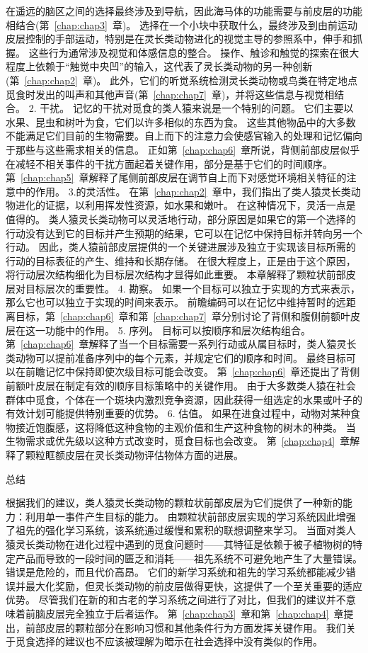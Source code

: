 在遥远的脑区之间的选择最终涉及到导航，因此海马体的功能需要与前皮层的功能相结合(第~\ref{chap:chap3}~章)。
选择在一个小块中获取什么，最终涉及到由前运动皮层控制的手部运动，特别是在灵长类动物进化的视觉主导的参照系中，伸手和抓握。
这些行为通常涉及视觉和体感信息的整合。
操作、触诊和触觉的探索在很大程度上依赖于“触觉中央凹”的输入，这代表了灵长类动物的另一种创新(第~\ref{chap:chap2}~章)。
此外，它们的听觉系统检测灵长类动物或鸟类在特定地点觅食时发出的叫声和其他声音(第~\ref{chap:chap7}~章)，并将这些信息与视觉相结合。
2. 干扰。
记忆的干扰对觅食的类人猿来说是一个特别的问题。
它们主要以水果、昆虫和树叶为食，它们以许多相似的东西为食。
这些其他物品中的大多数不能满足它们目前的生物需要。自上而下的注意力会使感官输入的处理和记忆偏向于那些与这些需求相关的信息。
正如第~\ref{chap:chap6}~章所说，背侧前部皮层似乎在减轻不相关事件的干扰方面起着关键作用，部分是基于它们的时间顺序。
第~\ref{chap:chap5}~章解释了尾侧前部皮层在调节自上而下对感觉环境相关特征的注意中的作用。
3.的灵活性。
在第~\ref{chap:chap2}~章中，我们指出了类人猿灵长类动物进化的证据，以利用挥发性资源，如水果和嫩叶。
在这种情况下，灵活一点是值得的。
类人猿灵长类动物可以灵活地行动，部分原因是如果它的第一个选择的行动没有达到它的目标并产生预期的结果，它可以在记忆中保持目标并转向另一个行动。
因此，类人猿前部皮层提供的一个关键进展涉及独立于实现该目标所需的行动的目标表征的产生、维持和长期存储。
在很大程度上，正是由于这个原因，将行动层次结构细化为目标层次结构才显得如此重要。
本章解释了颗粒状前部皮层对目标层次的重要性。
4. 勘察。
如果一个目标可以独立于实现的方式来表示，那么它也可以独立于实现的时间来表示。
前瞻编码可以在记忆中维持暂时的远距离目标，第~\ref{chap:chap6}~章和第~\ref{chap:chap7}~章分别讨论了背侧和腹侧前额叶皮层在这一功能中的作用。
5. 序列。
目标可以按顺序和层次结构组合。
第~\ref{chap:chap6}~章解释了当一个目标需要一系列行动或从属目标时，类人猿灵长类动物可以提前准备序列中的每个元素，并规定它们的顺序和时间。
最终目标可以在前瞻记忆中保持即使次级目标可能会改变。
第~\ref{chap:chap6}~章还提出了背侧前额叶皮层在制定有效的顺序目标策略中的关键作用。
由于大多数类人猿在社会群体中觅食，个体在一个斑块内激烈竞争资源，因此获得一组选定的水果或叶子的有效计划可能提供特别重要的优势。
6. 估值。
如果在进食过程中，动物对某种食物接近饱腹感，这将降低这种食物的主观价值和生产这种食物的树木的种类。
当生物需求或优先级以这种方式改变时，觅食目标也会改变。
第~\ref{chap:chap4}~章解释了颗粒眶额皮层在灵长类动物评估物体方面的进展。



总结

根据我们的建议，类人猿灵长类动物的颗粒状前部皮层为它们提供了一种新的能力：利用单一事件产生目标的能力。
由颗粒状前部皮层实现的学习系统因此增强了祖先的强化学习系统，该系统通过缓慢和累积的联想调整来学习。
当面对类人猿灵长类动物在进化过程中遇到的觅食问题时——其特征是依赖于被子植物树的特定产品而导致的一段时间的匮乏和消耗——祖先系统不可避免地产生了大量错误。
错误是危险的，而且代价高昂。
它们的新学习系统和祖先的学习系统都能减少错误并最大化奖励，但灵长类动物的前皮层做得更快，这提供了一个至关重要的适应优势。
尽管我们在新的和古老的学习系统之间进行了对比，但我们的建议并不意味着前脑皮层完全独立于后者运作。
第~\ref{chap:chap3}~章和第~\ref{chap:chap4}~章提出，前部皮层的颗粒部分在影响习惯和其他条件行为方面发挥关键作用。
我们关于觅食选择的建议也不应该被理解为暗示在社会选择中没有类似的作用。



